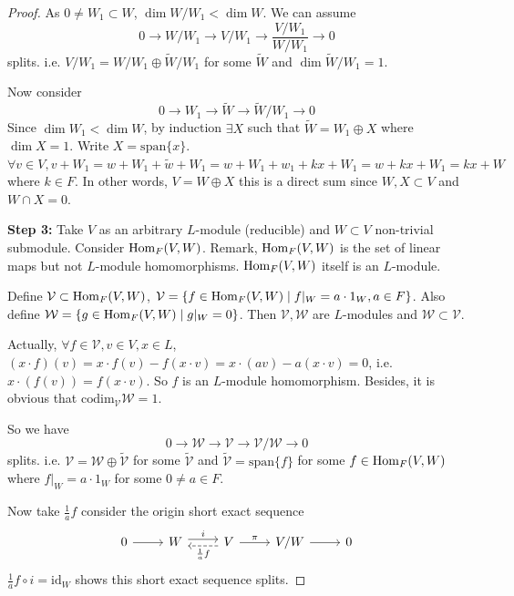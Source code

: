 \begin{proof}
    As $0 \neq W_1 \subset W$, $\dim W/W_1 < \dim W$. We can assume
    \[
        0 \longrightarrow W/W_1 \longrightarrow V/W_1 \longrightarrow \frac{V/W_1}{W/W_1} \longrightarrow 0
    \]
    splits. i.e. $V/W_1 = W/W_1 \oplus \tilde{W}/W_1$ for some $\tilde{W}$ and $\dim \tilde{W}/W_1 = 1$.

    Now consider
    \[
        0 \longrightarrow W_1 \longrightarrow \tilde{W} \longrightarrow \tilde{W}/W_1 \longrightarrow 0
    \]
    Since $\dim W_1 < \dim W$, by induction $\exists X$ such that $\tilde{W} = W_1 \oplus X$ where $\dim X = 1$. Write $X = \mathrm{span}\{x\}$. $\forall v \in V, v + W_1 = w + W_1 + \tilde{w} + W_1 = w + W_1 + w_1 + kx + W_1 = w + kx + W_1 = kx + W$ where $k \in F$. In other words, $V = W \oplus X$ this is a direct sum since $W, X \subset V$ and $W \cap X = 0$.

    \vspace{1em}
    \noindent \textbf{Step 3:} Take $V$ as an arbitrary $L$-module (reducible) and $W \subset V$ non-trivial submodule. Consider $\mathrm{Hom}_F(V, W)$. Remark, $\mathrm{Hom}_F(V, W)$ is the set of linear maps but not $L$-module homomorphisms. $\mathrm{Hom}_F(V, W)$ itself is an $L$-module.

    Define $\mathcal{V} \subset \mathrm{Hom}_F(V, W)$, $\mathcal{V} = \{f \in \mathrm{Hom}_F(V, W) \mid f|_W = a \cdot 1_W, a \in F\}$. Also define $\mathcal{W} = \{g \in \mathrm{Hom}_F(V, W) \mid g|_W = 0\}$. Then $\mathcal{V}, \mathcal{W}$ are $L$-modules and $\mathcal{W} \subset \mathcal{V}$.

    Actually, $\forall f \in \mathcal{V}, v \in V, x \in L$, $(x \cdot f)(v) = x \cdot f(v) - f(x \cdot v) = x \cdot (av) - a(x \cdot v) = 0$, i.e. $x \cdot (f(v)) = f(x \cdot v)$. So $f$ is an $L$-module homomorphism. Besides, it is obvious that $\mathrm{codim}_{\mathcal{V}} \mathcal{W} = 1$.

    So we have
    \[
        0 \longrightarrow \mathcal{W} \longrightarrow \mathcal{V} \longrightarrow \mathcal{V}/\mathcal{W} \longrightarrow 0
    \]
    splits. i.e. $\mathcal{V} = \mathcal{W} \oplus \tilde{\mathcal{V}}$ for some $\tilde{\mathcal{V}}$ and $\tilde{\mathcal{V}} = \mathrm{span}\{f\}$ for some $f \in \mathrm{Hom}_F(V, W)$ where $f|_W = a \cdot 1_W$ for some $0 \neq a \in F$.

    Now take $\frac{1}{a}f$ consider the origin short exact sequence
    \[
        \begin{tikzcd}
            0 \arrow[r] & W \arrow[r, "i", shift left=0.6ex] & V \arrow[l, "\frac{1}{a}f", dashed, shift left=0.6ex] \arrow[r, "\pi"] & V/W \arrow[r] & 0
        \end{tikzcd}
    \]
    $\frac{1}{a}f \circ i = \mathrm{id}_W$ shows this short exact sequence splits.

\end{proof}



